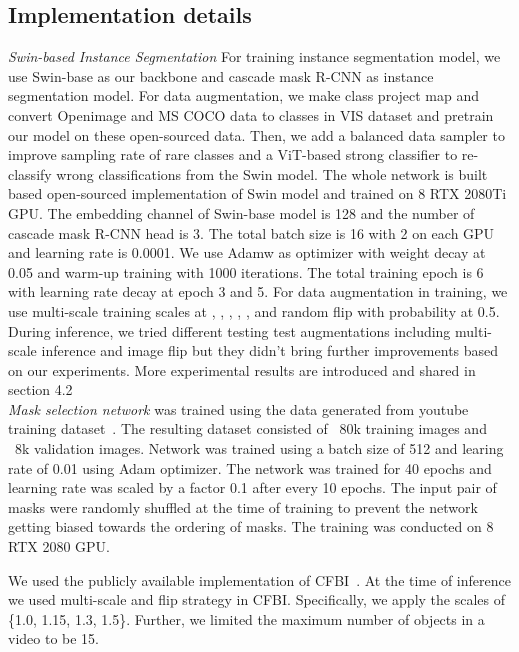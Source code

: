 \documentclass[final]{cvpr}
\begin{document}
\subsection{Implementation details}
\noindent \textit{Swin-based Instance Segmentation} For training instance segmentation model, we use Swin-base as our backbone and cascade mask R-CNN as instance segmentation model. For data augmentation, we make class project map and convert Openimage and MS COCO data to classes in VIS dataset and pretrain our model on these open-sourced data. Then, we add a balanced data sampler to improve sampling rate of rare classes and a ViT-based strong classifier to re-classify wrong classifications from the Swin model. The whole network is built based open-sourced implementation of Swin model and trained on 8 RTX 2080Ti GPU. The embedding channel of Swin-base model is 128 and the number of cascade mask R-CNN head is 3. The total batch size is 16 with 2 on each GPU and learning rate is 0.0001. We use Adamw as optimizer with weight decay at 0.05 and warm-up training with 1000 iterations. The total training epoch is 6 with learning rate decay at epoch 3 and 5. For data augmentation in training, we use multi-scale training scales at , , , , ,  and random flip with probability at 0.5. During inference, we tried different testing test augmentations including multi-scale inference and image flip but they didn't bring further improvements based on our experiments. More experimental results are introduced and shared in section 4.2\\

\textit{Mask selection network} was trained using the data generated from  youtube training dataset~\cite{yang2019video}. The resulting dataset consisted of ~80k training images and ~8k validation images. Network was trained using a batch size of 512 and learing rate of 0.01 using Adam optimizer. The network was trained for 40 epochs and learning rate was scaled by a factor 0.1 after every 10 epochs. The input pair of masks were randomly shuffled at the time of training to prevent the network getting biased towards the ordering of masks. The training was conducted on 8 RTX 2080 GPU.


We used the publicly available implementation of CFBI~\cite{yang2020collaborative}. At the time of inference we used multi-scale and flip strategy in CFBI. Specifically, we apply the scales of \{1.0, 1.15, 1.3, 1.5\}. Further, we limited the maximum number of objects in a video to be 15.
\end{document}
